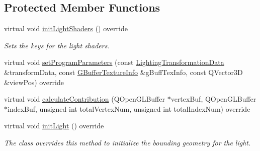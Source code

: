 \subsection*{Protected Member Functions}
\begin{DoxyCompactItemize}
\item 
\mbox{\label{class_geometry_engine_1_1_geometry_world_item_1_1_geometry_light_1_1_shadow_spotlight_aa4de61784b3cdb56739255fbcc00818c}} 
virtual void \mbox{\hyperlink{class_geometry_engine_1_1_geometry_world_item_1_1_geometry_light_1_1_shadow_spotlight_aa4de61784b3cdb56739255fbcc00818c}{init\+Light\+Shaders}} () override
\begin{DoxyCompactList}\small\item\em Sets the keys for the light shaders. \end{DoxyCompactList}\item 
virtual void \mbox{\hyperlink{class_geometry_engine_1_1_geometry_world_item_1_1_geometry_light_1_1_shadow_spotlight_aea5bd6e9315d5df327f59d752f8c6f95}{set\+Program\+Parameters}} (const \mbox{\hyperlink{struct_geometry_engine_1_1_lighting_transformation_data}{Lighting\+Transformation\+Data}} \&transform\+Data, const \mbox{\hyperlink{struct_geometry_engine_1_1_g_buffer_texture_info}{G\+Buffer\+Texture\+Info}} \&g\+Buff\+Tex\+Info, const Q\+Vector3D \&view\+Pos) override
\item 
virtual void \mbox{\hyperlink{class_geometry_engine_1_1_geometry_world_item_1_1_geometry_light_1_1_shadow_spotlight_a27163f2f8903220d7eaae7aa70c9d6e6}{calculate\+Contribution}} (Q\+Open\+G\+L\+Buffer $\ast$vertex\+Buf, Q\+Open\+G\+L\+Buffer $\ast$index\+Buf, unsigned int total\+Vertex\+Num, unsigned int total\+Index\+Num) override
\item 
\mbox{\label{class_geometry_engine_1_1_geometry_world_item_1_1_geometry_light_1_1_shadow_spotlight_a93e2c91b4377ecb98cf4c0409364c7be}} 
virtual void \mbox{\hyperlink{class_geometry_engine_1_1_geometry_world_item_1_1_geometry_light_1_1_shadow_spotlight_a93e2c91b4377ecb98cf4c0409364c7be}{init\+Light}} () override
\begin{DoxyCompactList}\small\item\em The class overrides this method to initialize the bounding geometry for the light. \end{DoxyCompactList}\end{DoxyCompactItemize}
